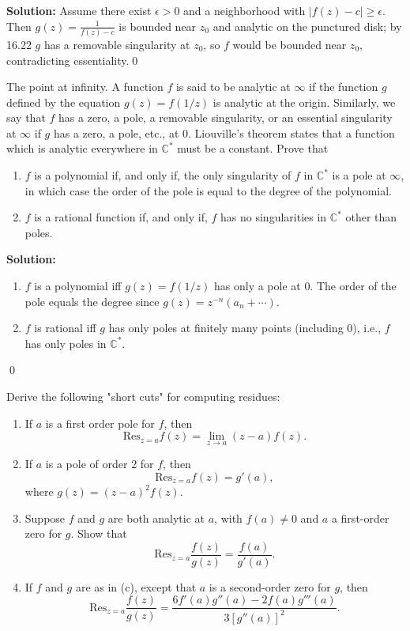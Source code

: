\noindent\textbf{Solution:}
Assume there exist $\epsilon>0$ and a neighborhood with $|f(z)-c|\ge\epsilon$. Then $g(z)=\frac{1}{f(z)-c}$ is bounded near $z_0$ and analytic on the punctured disk; by 16.22 $g$ has a removable singularity at $z_0$, so $f$ would be bounded near $z_0$, contradicting essentiality.\qed


\begin{problembox}
The point at infinity. A function \( f \) is said to be analytic at \( \infty \) if the function \( g \) defined by the equation \( g(z) = f(1/z) \) is analytic at the origin. Similarly, we say that \( f \) has a zero, a pole, a removable singularity, or an essential singularity at \( \infty \) if \( g \) has a zero, a pole, etc., at 0. Liouville's theorem states that a function which is analytic everywhere in \( \mathbb{C}^* \) must be a constant. Prove that
\begin{enumerate}[label=(\alph*)]
\item \( f \) is a polynomial if, and only if, the only singularity of \( f \) in \( \mathbb{C}^* \) is a pole at \( \infty \), in which case the order of the pole is equal to the degree of the polynomial.
\item \( f \) is a rational function if, and only if, \( f \) has no singularities in \( \mathbb{C}^* \) other than poles.
\end{enumerate}
\end{problembox}

\noindent\textbf{Solution:}
\begin{enumerate}[label=(\alph*)]
\item $f$ is a polynomial iff $g(z)=f(1/z)$ has only a pole at $0$. The order of the pole equals the degree since $g(z)=z^{-n}(a_n+\cdots)$.
\item $f$ is rational iff $g$ has only poles at finitely many points (including $0$), i.e., $f$ has only poles in $\mathbb C^*$.
\end{enumerate}\qed


\begin{problembox}
Derive the following "short cuts" for computing residues:
\begin{enumerate}[label=(\alph*)]
\item If \( a \) is a first order pole for \( f \), then
\[ \text{Res}_{z=a} f(z) = \lim_{z \to a} (z - a) f(z). \]
\item If \( a \) is a pole of order 2 for \( f \), then
\[ \text{Res}_{z=a} f(z) = g'(a), \]
where \( g(z) = (z - a)^2 f(z) \).
\item Suppose \( f \) and \( g \) are both analytic at \( a \), with \( f(a) \neq 0 \) and \( a \) a first-order zero for \( g \). Show that
\[ \text{Res}_{z=a} \frac{f(z)}{g(z)} = \frac{f(a)}{g'(a)}. \]
\item If \( f \) and \( g \) are as in (c), except that \( a \) is a second-order zero for \( g \), then
\[ \text{Res}_{z=a} \frac{f(z)}{g(z)} = \frac{6 f'(a) g''(a) - 2 f(a) g'''(a)}{3 [g''(a)]^2}. \]
\end{enumerate}
\end{problembox}

